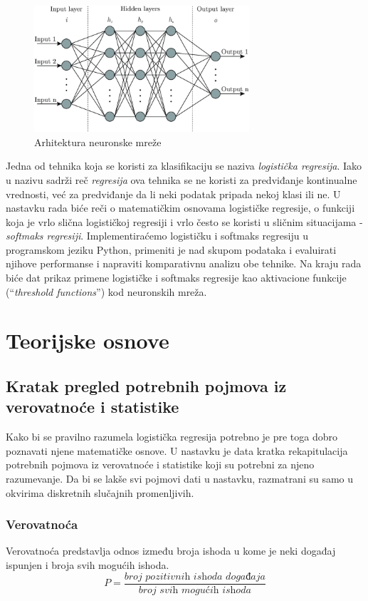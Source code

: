 \documentclass[a4paper,12pt]{report}
\begin{document}
\begin{figure}[ht]
	\centering
	\includegraphics[width=8cm]{neuronske_mreze.png}
	\caption{Arhitektura neuronske mreže}\label{fig:prettypic}
\end{figure}

Jedna od tehnika koja se koristi za klasifikaciju se naziva \textit{logistička regresija}. Iako u nazivu sadrži reč \textit{regresija} ova tehnika se ne koristi za predviđanje kontinualne vrednosti, već za predviđanje da li neki podatak pripada nekoj klasi ili ne. U nastavku rada biće reči o matematičkim osnovama logističke regresije, o funkciji koja je vrlo slična logističkoj regresiji i vrlo često se koristi u sličnim situacijama - \textit{softmaks regresiji}. Implementiraćemo logističku i softmaks regresiju u programskom jeziku Python, primeniti je nad skupom podataka i evaluirati njihove performanse i napraviti komparativnu analizu obe tehnike. Na kraju rada biće dat prikaz primene logističke i softmaks regresije kao 
aktivacione funkcije (\enquote {\textit{threshold functions}}) kod neuronskih mreža.
\chapter{Teorijske osnove}

\section{Kratak pregled potrebnih pojmova iz verovatnoće i statistike}
Kako bi se pravilno razumela logistička regresija potrebno je pre toga dobro poznavati njene matematičke osnove. U nastavku je data kratka rekapitulacija potrebnih pojmova iz verovatnoće i statistike koji su potrebni za njeno razumevanje. Da bi se lakše svi pojmovi dati u nastavku, razmatrani su samo u okvirima diskretnih slučajnih promenljivih.\\

\subsection{Verovatnoća} 
Verovatnoća predstavlja odnos između broja ishoda u kome je neki događaj ispunjen i broja svih mogućih ishoda. 
\begin{equation} \label{eq:1}
	P = \frac{\textit{broj pozitivnih ishoda događaja}}{\textit{broj svih mogućih ishoda}} 
 \end{equation}
 
\end{document}
